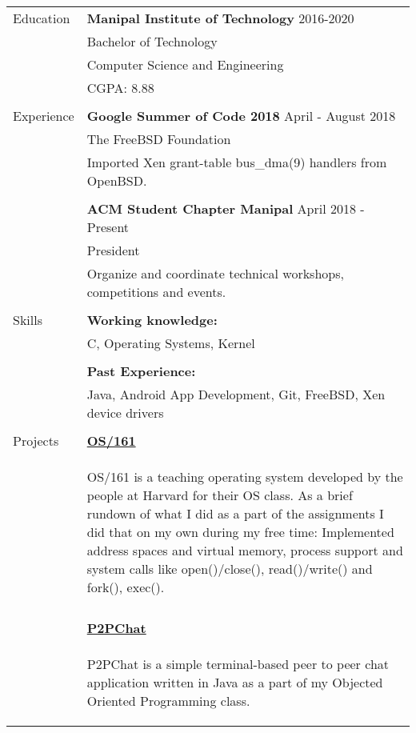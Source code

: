 \documentclass[letterpaper,11pt,oneside]{article}
\begin{document}
\noindent \begin{tabularx}{\textwidth}{l X}
 \Large{Education} & \textbf{Manipal Institute of Technology} \hfill 2016-2020  \\
     & Bachelor of Technology \\
     & Computer Science and Engineering \\
     &  CGPA: 8.88\\
     & \\
 \Large{Experience}    & \textbf{Google Summer of Code 2018} \hfill April - August 2018 \\
    & The FreeBSD Foundation \\
    & Imported Xen grant-table bus\_dma(9) handlers from OpenBSD. \\
    & \\
    & \textbf{ACM Student Chapter Manipal} \hfill April 2018 -  Present \\
    & President \\
    & Organize and coordinate technical workshops, competitions and events. \\
    & \\
 \Large{Skills} & \textbf{Working knowledge:} \\
    & C, Operating Systems, Kernel \\
    & \\
    & \textbf{Past Experience:} \\
    & Java, Android App Development, Git, FreeBSD, Xen device drivers \\
    & \\
 \Large{Projects} \vspace{-1.5ex} & \textbf{\href{https://github.com/prati0100/OS161}{OS/161}} \\
    \vspace{-3ex} & \begin{adjustwidth}{}{}OS/161 is a teaching operating system developed by the people at Harvard for their OS class. As a brief rundown of what I did as a part of the assignments I did that on my own during my free time: Implemented address spaces and virtual memory, process support and system calls like open()/close(), read()/write() and fork(), exec().\end{adjustwidth} \\
    & \\
    \vspace{-1.5ex} & \textbf{\href{https://github.com/prati0100/P2PChat}{P2PChat}} \\
    \vspace{-3ex} & \begin{adjustwidth}{}{}P2PChat is a simple terminal-based peer to peer chat application written in Java as a part of my Objected Oriented Programming class.\end{adjustwidth} \\

\end{tabularx}
\end{document}

